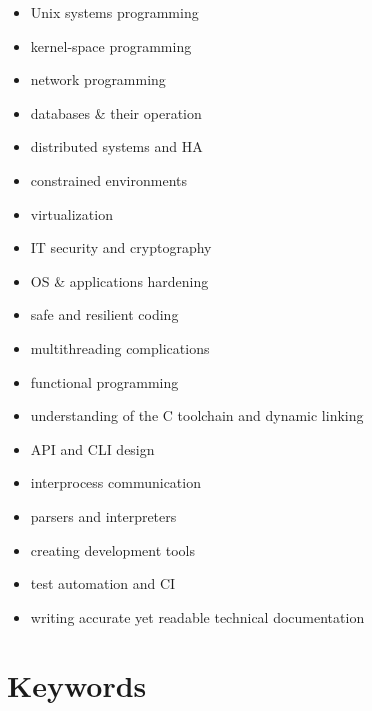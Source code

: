 \documentclass[a4paper,12pt]{article}
\newcommand{\compress}{\setlength\itemsep{-\parskip}}
\newenvironment{compressedItemize}{\begin{itemize}\compress}{\end{itemize}}
\begin{document}
\begin{multicols}{3}
\begin{compressedItemize}
\item	Unix systems programming
\item	kernel-space programming
\item	network programming
\item	databases \& their operation
\item	distributed systems and HA
\item	constrained environments
\item	virtualization
\columnbreak
\item	IT security and cryptography
\item	OS \& applications hardening
\item	safe and resilient coding
\item	multithreading complications
\item	functional programming
\item	understanding of the C tool\-chain and dynamic linking
\columnbreak
\item	API and CLI design
\item	interprocess communication
\item	parsers and interpreters
\item	creating development tools
\item	test automation and CI
\item	writing accurate yet readable
	technical documentation
\end{compressedItemize}
\end{multicols}

\section{Keywords}
\end{document}
